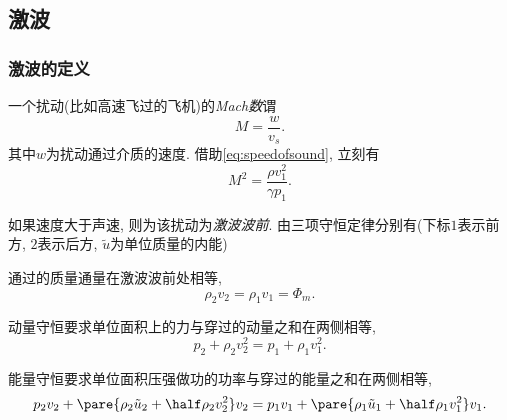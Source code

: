 \documentclass[../Thermal.tex]{subfiles}
\begin{document}
\subsection{激波}
\subsubsection{激波的定义}
一个扰动(比如高速飞过的飞机)的\emph{Mach数}谓
\[ M = \frac{w}{v_s}. \]
其中$w$为扰动通过介质的速度. 借助\eqref{eq:speedofsound}, 立刻有
\begin{equation}
\label{eq:Msquaredinthermals}
M^2 = \frac{\rho v_1^2}{\gamma p_1}.
\end{equation}
\par
如果速度大于声速, 则为该扰动为\emph{激波波前}. 由三项守恒定律分别有(下标$1$表示前方, $2$表示后方, $\tilde{u}$为单位质量的内能)
\begin{cenum}
\item 通过的质量通量在激波波前处相等,
\begin{equation}
\label{eq:shockmassconservation}
\rho_2 v_2 = \rho_1 v_1 = \Phi_m.
\end{equation}
\item 动量守恒要求单位面积上的力与穿过的动量之和在两侧相等,
\begin{equation}
\label{eq:shockmomentumconservation}
p_2 + \rho_2 v_2^2 = p_1 + \rho_1 v_1^2.
\end{equation}
\item 能量守恒要求单位面积压强做功的功率与穿过的能量之和在两侧相等,
\begin{equation}
\label{eq:shockenergyconservation}
p_2 v_2 + \pare{\rho_2 \tilde{u}_2 + \half \rho_2 v_2^2}v_2 = p_1 v_1 + \pare{\rho_1 \tilde{u}_1 + \half \rho_1 v_1^2}v_1.
\end{equation}
\end{cenum}
\end{document}
